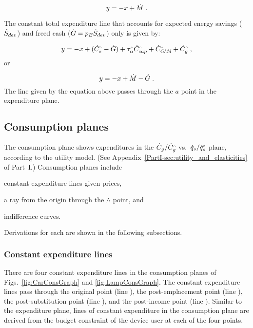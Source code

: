 \begin{equation}
  y = -x + \dot{M} \; .
\end{equation}

The constant total expenditure line 
that accounts for expected energy savings ($\dot{S}_{dev}$) 
and freed cash ($\dot{G} = p_E \dot{S}_{dev}$) only 
is given by:

\begin{equation}
  y = -x + ({}{\dot{C}}^{\scriptscriptstyle \circ}_s - \dot{G}) + {}{\tau}^{\scriptscriptstyle \circ}_\alpha {}{\dot{C}}^{\scriptscriptstyle \circ}_{cap} + {}{\dot{C}}^{\scriptscriptstyle \circ}_{O\!M\!d} + {}{\dot{C}}^{\scriptscriptstyle \circ}_g \; ,
\end{equation}
%
or

\begin{equation}
  y = -x + \dot{M} - \dot{G}\; .
\end{equation}
%
The line given by the equation above
passes through the $a$ point in the expenditure plane.


\subsection{Consumption planes}
\label{sec:cons_path_graph_details}

The consumption plane shows expenditures in 
the $\dot{C}_g/{}{\dot{C}}^{\scriptscriptstyle \circ}_g$ vs.\ $\dot{q}_s/{}{\dot{q}}^{\scriptscriptstyle \circ}_s$ plane,
according to the utility model.
(See Appendix~\ref{PartI-sec:utility_and_elasticities} of Part~I.)
Consumption planes include 
%
\begin{enumerate*}[label={(\roman*)}]
	
  \item constant expenditure lines given prices,
  
  \item a ray from the origin through the $\wedge$ point, and 
  
  \item indifference curves.
    
\end{enumerate*}
%
Derivations for each are shown in the following subsections.


\subsubsection{Constant expenditure lines} 
\label{sec:pref_graph_constant_expenditure_lines}

There are four constant expenditure lines in the consumption planes of
Figs.~\ref{fig:CarConsGraph} and \ref{fig:LampConsGraph}.
The constant expenditure lines pass through 
the original point (line \circcirc{}), 
the post-emplacement point (line \starstar{}), 
the post-substitution point (line \hathat{}), and 
the post-income point (line \barbar{}).
Similar to the expenditure plane, 
lines of constant expenditure in the consumption plane
are derived from the budget constraint of the device user
at each of the four points.

